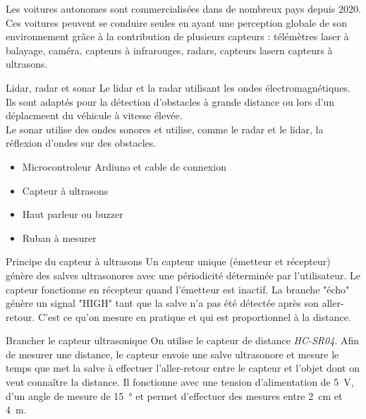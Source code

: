 \documentclass[a4paper,11pt,fleqn]{scrartcl}%
\begin{document}
	\maketitle
Les voitures autonomes sont commercialisées dans de nombreux pays depuis 2020. Ces voitures peuvent se conduire seules en ayant une perception globale de son environnement grâce à la contribution de plusieurs capteurs :  télémètres laser à balayage, caméra, capteurs à infrarouges, radars, capteurs lasern capteurs à ultrasons.
\begin{documentboxenv}{Lidar, radar et sonar}
    Le lidar et la radar utilisant les ondes électromagnétiques. Ils sont adaptés pour la détection d'obstacles à grande distance ou lors d'un déplacmeent du véhicule à vitesse élevée.\\
    Le sonar utilise des ondes sonores et utilise, comme le radar et le lidar, la réflexion d'ondes sur des obstacles.
\end{documentboxenv}

\begin{materiel}
\begin{itemize}
    \item Microcontroleur Ardiuno et cable de connexion
    \item Capteur à ultrasons
    \item Haut parleur ou buzzer
    \item Ruban à mesurer
\end{itemize}
\end{materiel}

\begin{documentboxenv}{Principe du capteur à ultrasons}
    Un capteur unique (émetteur et récepteur) génère des salves ultrasonores avec une périodicité déterminée par l'utilisateur. Le capteur fonctionne en récepteur quand l'émetteur est inactif. La branche "écho" génère un signal "HIGH" tant que la salve n'a pas été détectée après son aller-retour. C'est ce qu'on mesure en pratique et qui est proportionnel à la distance.
\end{documentboxenv}

\begin{documentboxenv}{Brancher le capteur ultrasonique}
    On utilise le capteur de distance \emph{HC-SR04}. Afin de mesurer une distance, le capteur envoie une salve ultrasonore et mesure le temps que met la salve à effectuer l'aller-retour entre le capteur et l'objet dont on veut connaître la distance. Il fonctionne avec une tension d'alimentation de \SI{5}{\volt}, d'un angle de mesure de \SI{15}{\degree} et permet d'effectuer des mesures entre \SI{2}{cm} et \SI{4}{m}.
\end{documentboxenv}
\end{document}
